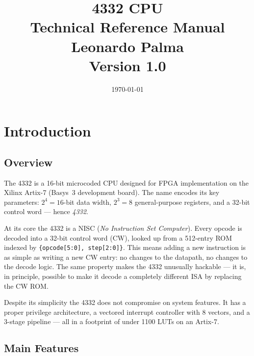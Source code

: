 \documentclass[a4paper,12pt]{report}
\title{
    {\Huge\bfseries 4332 CPU} \\[1em]
    {\Large Technical Reference Manual} \\[2em]
    {\large Leonardo Palma} \\[0.5em]
    {\large Version 1.0}
}
\date{\today}
\newcommand{\field}[1]{\texttt{\small #1}}
\begin{document}
\maketitle
\thispagestyle{empty}

\tableofcontents
\newpage

\chapter{Introduction}

\section{Overview}

The 4332 is a 16-bit microcoded CPU designed for FPGA implementation on the Xilinx Artix-7 (Basys~3 development board). The name encodes its key parameters: $2^4 = 16$-bit data width, $2^3 = 8$ general-purpose registers, and a 32-bit control word --- hence \emph{4332}.

At its core the 4332 is a NISC (\emph{No Instruction Set Computer}). Every opcode is decoded into a 32-bit control word (CW), looked up from a 512-entry ROM indexed by \field{\{opcode[5:0], step[2:0]\}}. This means adding a new instruction is as simple as writing a new CW entry: no changes to the datapath, no changes to the decode logic. The same property makes the 4332 unusually hackable --- it is, in principle, possible to make it decode a completely different ISA by replacing the CW ROM.

Despite its simplicity the 4332 does not compromise on system features. It has a proper privilege architecture, a vectored interrupt controller with 8 vectors, and a 3-stage pipeline --- all in a footprint of under 1100 LUTs on an Artix-7.

\section{Main Features}
\end{document}
